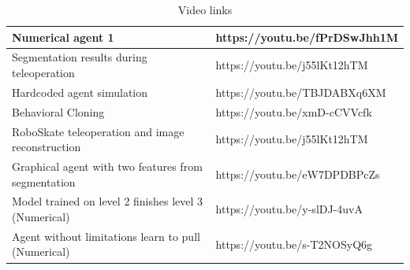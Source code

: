 \documentclass[conference]{IEEEtran}
\begin{document}





\newpage
\onecolumn
\appendix


\begin{table}[ht!]
    \renewcommand{\arraystretch}{1.3}
    \caption{Video links}
    \centering
    \begin{tabular}{l l} 
        \hline
        Numerical agent 1 & https://youtu.be/fPrDSwJhh1M \\ 
        \hline
        Segmentation results during teleoperation &  https://youtu.be/j55lKt12hTM \\ 
        \hline
        Hardcoded agent simulation & https://youtu.be/TBJDABXq6XM \\
        \hline
        Behavioral Cloning & https://youtu.be/xmD-cCVVcfk \\
        \hline
        RoboSkate teleoperation and image reconstruction & https://youtu.be/j55lKt12hTM \\
        \hline
        Graphical agent with two features from segmentation & https://youtu.be/eW7DPDBPcZs \\
        \hline
        Model trained on level 2 finishes level 3 (Numerical) & https://youtu.be/y-slDJ-4uvA\\
        \hline
        Agent without limitations learn to pull (Numerical) & https://youtu.be/s-T2NOSyQ6g\\
    
    \end{tabular}
\end{table}

\end{document}
